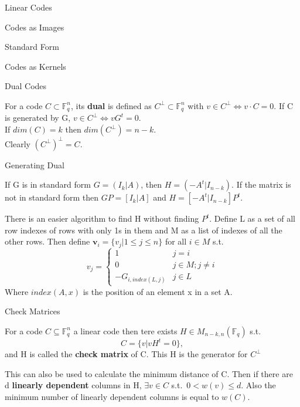 \documentclass[12pt, letterpaper]{article}
\newcommand{\F}{\mathbb{F}}
\begin{document}
\begin{section}{Linear Codes}
\begin{subsection}{Codes as Images}
\begin{subsubsection}{Standard Form}
    \end{subsubsection}

  \end{subsection}

  \begin{subsection}{Codes as Kernels}

    \begin{subsubsection}{Dual Codes}

      For a code \(C \subset \F^{n}_{q}\), its \textbf{dual} is defined as
      \(C^{\bot} \subset \F^{n}_{q}\) with \(v \in C^{\bot} \iff v \cdot C
      = 0\). If C is generated by G, \(v \in C^{\bot} \iff vG^{t} = 0\). \\
      If \(dim(C) = k\) then \(dim(C^{\bot}) = n - k\). \\
      Clearly \((C^{\bot})^{\bot} = C\).

    \end{subsubsection}

    \begin{subsubsection}{Generating Dual}

      If G is in standard form \(G = (I_{k} | A)\), then \(H =
      (-A^{t} | I_{n - k})\). If the matrix is not in standard form then \(GP =
      [I_{k} | A]\) and \(H = [-A^{t} | I_{n - k}] P^{t}\).

      There is an easier algorithm to find H without finding \(P^{t}\). Define L
      as a set of all row indexes of rows with only 1s in them and M as a list
      of indexes of all the other rows. Then define \(\textbf{v}_{i} =
      \{v_{j} | 1 \leq j \leq n\}\) for all \(i \in M\) s.t.\ \[v_{j} =
      \begin{cases}
        1 & j = i \\
        0 & j \in M; j \neq i\\
        -G_{i, index(L, j)} & j \in L
      \end{cases}\]
      Where \(index(A, x)\) is the position of an element x in a set A.

    \end{subsubsection}

    \begin{subsubsection}{Check Matrices}

      For a code \(C \subseteq \F^{n}_{q}\) a linear code then tere exists
      \(H \in M_{n - k, n}(\F_{q})\) s.t.\ \[C = \{ v | vH^{t} = 0\},\] and H is
      called the \textbf{check matrix} of C. This H is the generator for
      \(C^{\bot}\)

      This can also be used to calculate the minimum distance of C. Then if
      there are d \textbf{linearly dependent} columns in H, \(\exists v \in C\)
      s.t.\ \(0 < w(v) \leq d\). Also the minimum number of linearly dependent
      columns is equal to \(w(C)\).

    \end{subsubsection}

  \end{subsection}

\end{section}
\end{document}
